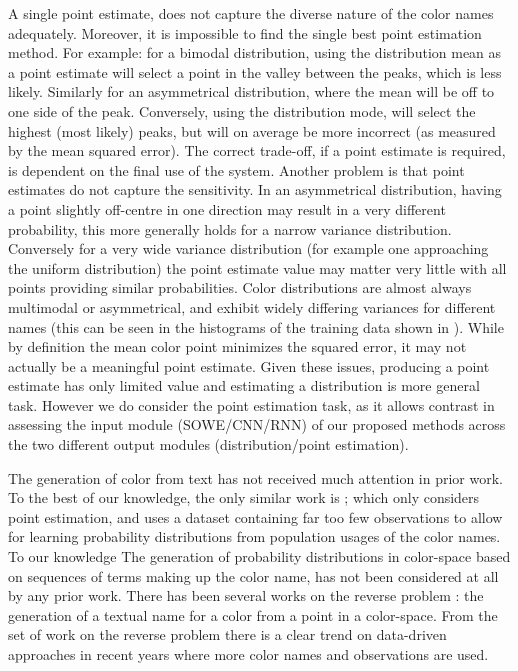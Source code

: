 \documentclass[]{clv3}
\newcommand{\parencite}{\citep}
\newcommand{\textcite}{\citet}
\begin{document}
A single point estimate, does not capture the diverse nature of the color names adequately. Moreover, it is impossible to find the single best point estimation method.
For example: for a bimodal distribution, using the distribution mean as a point estimate will select a point in the valley between the peaks, which is less likely.
Similarly for an asymmetrical distribution, where the mean will be off to one side of the peak.
Conversely, using the distribution mode, will select the highest (most likely) peaks, but will on average be more incorrect (as measured by the mean squared error).
The correct trade-off, if a point estimate is required, is dependent on the final use of the system.
Another problem is that point estimates do not capture the sensitivity.
In an asymmetrical distribution, having a point slightly off-centre in one direction may result in a very different probability,
this more generally holds for a narrow variance distribution.
Conversely for a very wide variance distribution (for example one approaching the uniform distribution) the point estimate value may matter very little with all points providing similar probabilities.
Color distributions are almost always multimodal or asymmetrical, and exhibit widely differing variances for different names (this can be seen in the histograms of the training data shown in ).
While by definition the mean color point minimizes the squared error, it may not actually be a  meaningful point estimate.
Given these issues, producing a point estimate has only limited value and estimating a distribution is more general task.
However we do consider the point estimation task, as it allows contrast in assessing the input module (SOWE/CNN/RNN) of our proposed methods across the two different output modules (distribution/point estimation).

The generation of color from text has not received much attention in prior work.
To the best of our knowledge, the only similar work is \textcite{DBLP:journals/corr/KawakamiDRS16};
which only considers point estimation,
and uses a dataset containing far too few observations to allow for learning probability distributions from population usages of the color names.
To our knowledge The generation of probability distributions in color-space based on sequences of terms making up the color name, has not been considered at all by any prior work.
There has been several works on the reverse problem \parencite{mcmahan2015bayesian,meomcmahanstone:color,2016arXiv160603821M}: the generation of a textual name for a color from a point in a color-space.
From the set of work on the reverse problem there is a clear trend on data-driven approaches in recent years where more color names and observations are used.
\end{document}
